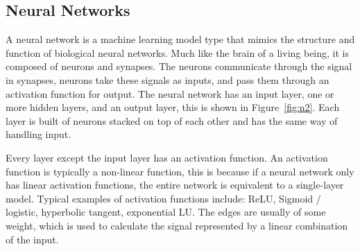\documentclass[a4paper,12pt]{article}
\begin{document}
\subsection{Neural Networks}
A neural network is a machine learning model type that mimics the structure and function of biological neural networks. Much like the brain of a living being, it is composed of neurons and synapses. The neurons communicate through the signal in synapses, neurons take these signals as inputs, and pass them through an activation function for output.
The neural network has an input layer, one or more hidden layers, and an output layer, this is shown in Figure~\ref{fig:n2}. Each layer is built of neurons stacked on top of each other and has the same way of handling input.


Every layer except the input layer has an activation function. An activation function is typically a non-linear function, this is because if a neural network only has linear activation functions, the entire network is equivalent to a single-layer model.
Typical examples of activation functions include: ReLU, Sigmoid / logistic, hyperbolic tangent, exponential LU. The edges are usually of some weight, which is used to calculate the signal represented by a linear combination of the input.
\end{document}
